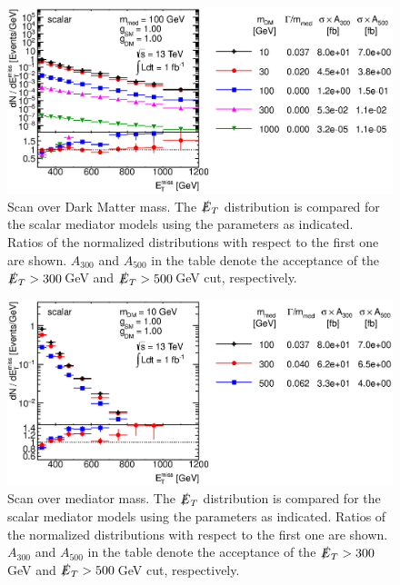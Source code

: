 \begin{figure}
\centering
\includegraphics[width=0.9\linewidth]{figures/monojet/scan_mDM_S_100.eps}
\caption{Scan over Dark Matter mass. The $\slashed{E}_T$ distribution is compared for the scalar mediator models using the parameters as indicated. Ratios of the normalized distributions with respect to the first one are shown. $A_{300}$ and $A_{500}$ in the table denote the acceptance of the $\slashed{E}_T>300$\,GeV and $\slashed{E}_T>500$\,GeV cut, respectively.}
\label{fig:monojet_scan_S_mDM100}
\end{figure}

\begin{figure}
\centering
\includegraphics[width=0.9\linewidth]{figures/monojet/scan_mMed_S_10.eps}
\caption{Scan over mediator mass. The $\slashed{E}_T$ distribution is compared for the scalar mediator models using the parameters as indicated. Ratios of the normalized distributions with respect to the first one are shown. $A_{300}$ and $A_{500}$ in the table denote the acceptance of the $\slashed{E}_T>300$\,GeV and $\slashed{E}_T>500$\,GeV cut, respectively.}
\label{fig:monojet_scan_S_mMed10}
\end{figure}

